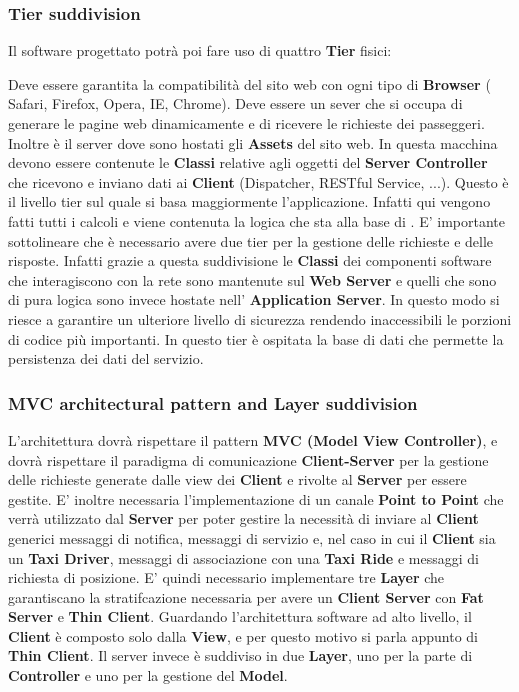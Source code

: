 \subsubsection{Tier suddivision}
Il software progettato potrà poi fare uso di quattro \textbf{Tier} fisici:
\begin{itemize}
	 Deve essere garantita la compatibilità del sito web con ogni tipo di \textbf{Browser} ( Safari, Firefox, Opera, IE, Chrome).
	 Deve essere un sever che si occupa di generare le pagine web dinamicamente e di ricevere le richieste dei passeggeri. Inoltre è il server dove sono hostati gli \textbf{Assets} del sito web. In questa macchina devono essere contenute le \textbf{Classi} relative agli oggetti del \textbf{Server Controller} che ricevono e inviano dati ai \textbf{Client} (Dispatcher, RESTful Service, ...).
	 Questo è il livello tier sul quale si basa maggiormente l'applicazione. 
	Infatti qui vengono fatti tutti i calcoli e viene contenuta la logica che sta alla base di \myTaxiService{}. 
	E' importante sottolineare che è necessario avere due tier per la gestione delle richieste e delle risposte. Infatti grazie a questa suddivisione le \textbf{Classi} dei componenti software che interagiscono con la rete sono mantenute sul \textbf{Web Server} e quelli che sono di pura logica sono invece hostate nell' \textbf{Application Server}.
	In questo modo si riesce a garantire un ulteriore livello di sicurezza rendendo inaccessibili le porzioni di codice più importanti.
	 In questo tier è ospitata la base di dati che permette la persistenza dei dati del servizio.
\end{itemize}
\subsubsection{MVC architectural pattern and Layer suddivision}
L'architettura dovrà rispettare il pattern \textbf{MVC (Model View Controller)}, e dovrà rispettare il paradigma di comunicazione \textbf{Client-Server} per la gestione delle richieste generate dalle view dei \textbf{Client} e rivolte al \textbf{Server} per essere gestite. 
E' inoltre necessaria l'implementazione di un canale \textbf{Point to Point} che verrà utilizzato dal \textbf{Server} per poter gestire la necessità di inviare al \textbf{Client} generici messaggi di notifica, messaggi di servizio e, nel caso in cui il \textbf{Client} sia un \textbf{Taxi Driver}, messaggi di associazione con una \textbf{Taxi Ride} e messaggi di richiesta di posizione.
E' quindi necessario implementare tre \textbf{Layer} che garantiscano la stratifcazione necessaria per avere un \textbf{Client Server} con \textbf{Fat Server} e \textbf{Thin Client}.
Guardando l'architettura software ad alto livello, il \textbf{Client} è composto solo dalla \textbf{View}, e per questo motivo si parla appunto di \textbf{Thin Client}. 
Il server invece è suddiviso in due \textbf{Layer}, uno per la parte di \textbf{Controller} e uno per la gestione del \textbf{Model}.
